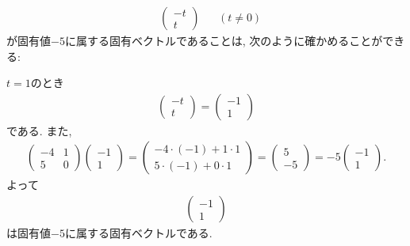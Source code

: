 \begin{checkanswer}%
  \begin{align*}
    &\begin{pmatrix}-t\\t\end{pmatrix}
       &&(t\neq 0)
  \end{align*}
  が固有値$-5$に属する固有ベクトルであることは,
  次のように確かめることができる:

  $t=1$のとき
  \begin{align*}
    \begin{pmatrix}-t\\t\end{pmatrix}=\begin{pmatrix}-1\\1\end{pmatrix}
  \end{align*}
  である.
  また,
  \begin{align*}
    \begin{pmatrix}-4&1\\5&0\end{pmatrix}\begin{pmatrix}-1\\1\end{pmatrix}
   =\begin{pmatrix}-4\cdot(-1)+1\cdot 1\\5\cdot(-1)+0\cdot1\end{pmatrix}
   =\begin{pmatrix}5\\-5\end{pmatrix}    
   =-5\begin{pmatrix}-1\\1\end{pmatrix}.
  \end{align*}
  よって
  \begin{align*}
    \begin{pmatrix}-1\\1\end{pmatrix}
  \end{align*}
  は固有値$-5$に属する固有ベクトルである.
\end{checkanswer}
